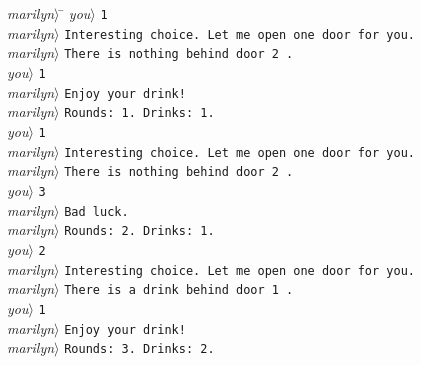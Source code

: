 \begin{tabbing}
  \emph{marilyn}$\rangle$ \=\kill
  \emph{you}$\rangle$ \>\verb}1}\\
  \emph{marilyn}$\rangle$ \>\verb}Interesting choice. Let me open one door for you.}\\
  \emph{marilyn}$\rangle$ \>\verb}There is nothing behind door 2 .}\\
  \emph{you}$\rangle$ \>\verb}1}\\
  \emph{marilyn}$\rangle$ \>\verb}Enjoy your drink!}\\
  \emph{marilyn}$\rangle$ \>\verb}Rounds: 1. Drinks: 1.}\\[1ex]
  \emph{you}$\rangle$ \>\verb}1}\\
  \emph{marilyn}$\rangle$ \>\verb}Interesting choice. Let me open one door for you.}\\
  \emph{marilyn}$\rangle$ \>\verb}There is nothing behind door 2 .}\\
  \emph{you}$\rangle$ \>\verb}3}\\
  \emph{marilyn}$\rangle$ \>\verb}Bad luck.}\\
  \emph{marilyn}$\rangle$ \>\verb}Rounds: 2. Drinks: 1.}\\[1ex]
  \emph{you}$\rangle$ \>\verb}2}\\
  \emph{marilyn}$\rangle$ \>\verb}Interesting choice. Let me open one door for you.}\\
  \emph{marilyn}$\rangle$ \>\verb}There is a drink behind door 1 .}\\
  \emph{you}$\rangle$ \>\verb}1}\\
  \emph{marilyn}$\rangle$ \>\verb}Enjoy your drink!}\\
  \emph{marilyn}$\rangle$ \>\verb}Rounds: 3. Drinks: 2.}\\
\end{tabbing}

